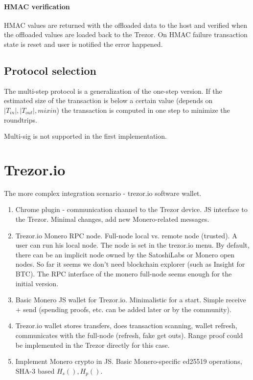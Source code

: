 \documentclass[]{article}
\begin{document}
\paragraph{HMAC verification}
HMAC values are returned with the offloaded data to the host and verified when the offloaded values are loaded back to the Trezor. 
On HMAC failure transaction state is reset and user is notified the error happened.

\subsection{Protocol selection}
The multi-step protocol is a generalization of the one-step version.
If the estimated size of the transaction is below a certain value (depends on $|T_{in}|, |T_{out}|, mixin$) the transaction is computed in one step to minimize the roundtrips. 

Multi-sig is not supported in the first implementation.

\section{Trezor.io}

The more complex integration scenario - trezor.io software wallet.
\begin{enumerate}
	\item Chrome plugin - communication channel to the Trezor device. 
	JS interface to the Trezor. Minimal changes, add new Monero-related messages.
	
	\item Trezor.io Monero RPC node. Full-node local vs. remote node (trusted). A user can run his local node. The node is set in the trezor.io menu. By default, there can be an implicit node owned by the SatoshiLabs or Monero open nodes. So far it seems we don't need blockchain explorer (such as Insight for BTC). The RPC interface of the monero full-node seems enough for the initial version.
	
	\item Basic Monero JS wallet for Trezor.io. Minimalistic for a start. Simple receive + send (spending proofs, etc. can be added later or by the community). 
	
	\item Trezor.io wallet stores transfers, does transaction scanning, wallet refresh, communicates with the full-node (refresh, fake get outs). Range proof could be implemented in the Trezor directly for this case. 
	
	\item Implement Monero crypto in JS. Basic Monero-specific ed25519 operations, SHA-3 based $H_s(), H_p()$.
	
\end{enumerate}
\end{document}
